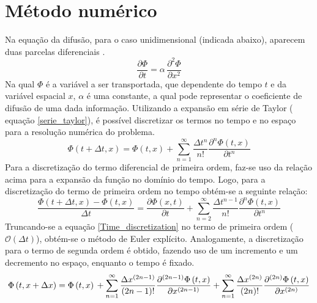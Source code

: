 \documentclass[10pt,twoside,a4paper]{article}
\begin{document}
\section{Método numérico} %
Na equação da difusão, para o caso unidimensional (indicada abaixo), aparecem duas parcelas diferenciais \cite{Leveque_parabolic}. 
\begin{equation} \label{difusao_pura}
	\frac{\partial \Phi}{\partial t} = \alpha \, \frac{\partial^{2} \Phi}{\partial x^{2}} %
\end{equation}
Na qual $\Phi$ é a variável a ser transportada, que dependente do tempo $t$ e da variável espacial $x$, $\alpha$ é uma constante, a qual pode representar o coeficiente de difusão de
uma dada informação.
Utilizando a expansão em série de Taylor ( equação \ref{serie_taylor}), é possível discretizar os termos no tempo e no espaço para a resolução numérica do problema. 
\begin{equation} \label{serie_taylor}
	\Phi \left(t+\Delta t, x\right)= \Phi \left(t, x\right) + \sum\limits_{n=1}^{\infty} \frac{\Delta t^{n}}{n!} \frac{\partial^{n} \Phi \left(t, x\right)}{\partial t^{n}}
\end{equation}
Para a discretização do termo diferencial de primeira ordem, faz-se uso da relação acima para a expansão da função no domínio do tempo. Logo, para a discretização do termo de primeira ordem no tempo obtém-se a seguinte relação:
\begin{equation} \label{Time_discretization}
\frac{\Phi \left(t+\Delta t, x\right)-\Phi \left(t, x\right)}{\Delta t}= \frac{\partial \Phi \left( x,t \right)}{\partial t} + \sum\limits_{n=2}^{\infty} \frac{\Delta t^{n-1}}{n!} \frac{\partial^{n} \Phi\left(t, x\right)}{\partial t^{n}}
\end{equation}
Truncando-se a equação \ref{Time_discretization} no termo de primeira ordem ($\mathcal{O}(\Delta t)$), obtém-se o método de Euler explícito.
Analogamente, a discretização para o termo de segunda ordem é obtido, fazendo uso de um incremento e um decremento no espaço, enquanto o tempo é fixado.
\begin{equation} \label{Spacial_discretization1}
	\Phi \left(t, x+\Delta x\right)= \Phi \left(t, x\right) \\
	+\sum\limits_{n=1}^{\infty} \frac{\Delta x^{\left(2n-1\right)}}{\left(2n-1\right)!} \frac{\partial^{\left(2n-1\right)} \Phi \left(t, x\right)}{\partial x^{\left(2n-1\right)}}\\
	+\sum\limits_{n=1}^{\infty} \frac{\Delta x^{\left(2n\right)}}{\left(2n\right)!} \frac{\partial^{\left(2n\right)} \Phi \left(t, x\right)}{\partial x^{\left(2n\right)}}
\end{equation}
\end{document}
